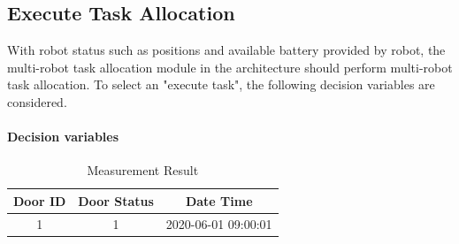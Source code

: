 \subsection{Execute Task Allocation}
\label{sec:task_allocation}
With robot status such as positions and available battery provided by robot, the multi-robot task allocation module in the architecture should perform multi-robot task allocation. To select an "execute task", the following decision variables are considered.

\paragraph*{Decision variables}

\begin{table}[htb]
\centering
\begin{tabular}{|c| c| c|} 
\hline
Door ID & Door Status & Date Time \\
\hline
1& 1 & 2020-06-01 09:00:01 \\ [1ex] 
\hline
\end{tabular}
\caption{Measurement Result}
\label{tab:measurement_result}
\end{table}

\begin{table}[htb]
\centering
{}
\caption{Door Open Possibility}
\label{tab:open_possibilities}
\end{table}

